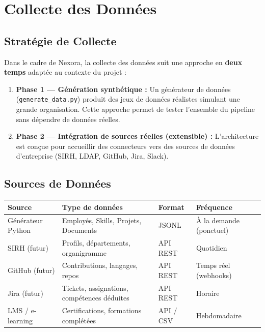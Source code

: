 \documentclass[12pt,a4paper]{article}
\begin{document}
\section{Collecte des Données}

\subsection{Stratégie de Collecte}

Dans le cadre de Nexora, la collecte des données suit une approche en \textbf{deux temps} adaptée au contexte du projet :

\begin{enumerate}
    \item \textbf{Phase 1 — Génération synthétique :} Un générateur de données (\texttt{generate\_data.py}) produit des jeux de données réalistes simulant une grande organisation. Cette approche permet de tester l'ensemble du pipeline sans dépendre de données réelles.
    
    \item \textbf{Phase 2 — Intégration de sources réelles (extensible) :} L'architecture est conçue pour accueillir des connecteurs vers des sources de données d'entreprise (SIRH, LDAP, GitHub, Jira, Slack).
\end{enumerate}

\subsection{Sources de Données}

\begin{longtable}{|p{3cm}|p{3.5cm}|p{2.5cm}|p{4.5cm}|}
\hline
\rowcolor{bleu!15}
\textbf{Source} & \textbf{Type de données} & \textbf{Format} & \textbf{Fréquence} \\
\hline
Générateur Python & Employés, Skills, Projets, Documents & JSONL & À la demande (ponctuel) \\
\hline
SIRH (futur) & Profils, départements, organigramme & API REST & Quotidien \\
\hline
GitHub (futur) & Contributions, langages, repos & API REST & Temps réel (webhooks) \\
\hline
Jira (futur) & Tickets, assignations, compétences déduites & API REST & Horaire \\
\hline
LMS / e-learning & Certifications, formations complétées & API / CSV & Hebdomadaire \\
\hline
\end{longtable}
\end{document}
